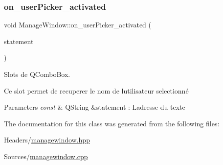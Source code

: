 \subsubsection{\texorpdfstring{on\+\_\+user\+Picker\+\_\+activated}{on\_userPicker\_activated}}
{\footnotesize\ttfamily void Manage\+Window\+::on\+\_\+user\+Picker\+\_\+activated (\begin{DoxyParamCaption}\item[{const Q\+String \&}]{statement }\end{DoxyParamCaption})\hspace{0.3cm}{\ttfamily [slot]}}



Slots de Q\+Combo\+Box. 

Ce slot permet de recuperer le nom de l\textquotesingle{}utilisateur selectionné 
\begin{DoxyParams}{Parameters}
{\em const} & Q\+String \&statement \+: L\textquotesingle{}adresse du texte \\
\hline
\end{DoxyParams}


The documentation for this class was generated from the following files\+:\begin{DoxyCompactItemize}
\item 
Headers/\mbox{\hyperlink{managewindow_8hpp}{managewindow.\+hpp}}\item 
Sources/\mbox{\hyperlink{managewindow_8cpp}{managewindow.\+cpp}}\end{DoxyCompactItemize}
